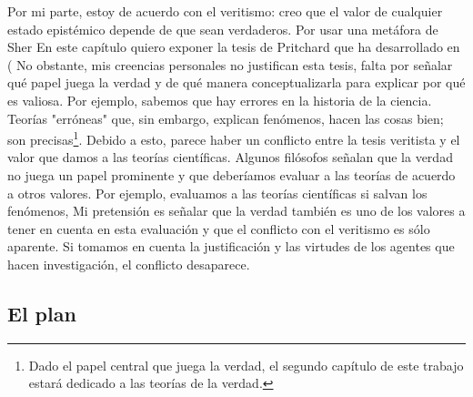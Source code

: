 Por mi parte, estoy de acuerdo con el veritismo: creo que el valor de cualquier estado epistémico depende de que sean verdaderos.
Por usar una metáfora de Sher%
En este capítulo quiero exponer la tesis de Pritchard que ha desarrollado en (%
No obstante, mis creencias personales no justifican esta tesis, falta por señalar qué papel juega la verdad y de qué manera conceptualizarla para explicar por qué es valiosa.
Por ejemplo, sabemos que hay errores en la historia de la ciencia.
Teorías "erróneas" que, sin embargo, explican fenómenos, hacen las cosas bien; son precisas\footnote{Dado el papel central que juega la verdad, el segundo capítulo de este trabajo estará dedicado a las teorías de la verdad.}.
Debido a esto, parece haber un conflicto entre la tesis veritista y el valor que damos a las teorías científicas.
Algunos filósofos señalan que la verdad no juega un papel prominente y que deberíamos evaluar a las teorías de acuerdo a otros valores.
Por ejemplo, evaluamos a las teorías científicas si salvan los fenómenos, %
 Mi pretensión es señalar que la verdad también es uno de los valores a tener en cuenta en esta evaluación y que el conflicto con el veritismo es sólo aparente.
Si tomamos en cuenta la justificación y las virtudes de los agentes que hacen investigación, el conflicto desaparece.

\subsection{El plan}

